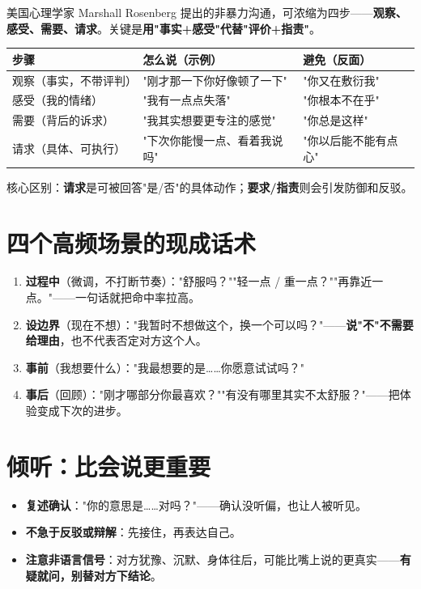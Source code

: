\documentclass[12pt,UTF8,openany]{ctexbook}
\begin{document}
美国心理学家 Marshall Rosenberg 提出的非暴力沟通，可浓缩为四步——\textbf{观察、感受、需要、请求}。关键是\textbf{用"事实+感受"代替"评价+指责"}。

\begin{tabularx}{\textwidth}{p{2.6cm}XX}
\toprule
步骤 & 怎么说（示例） & 避免（反面） \\
\midrule
观察（事实，不带评判） & "刚才那一下你好像顿了一下" & "你又在敷衍我" \\
感受（我的情绪） & "我有一点点失落" & "你根本不在乎" \\
需要（背后的诉求） & "我其实想要更专注的感觉" & "你总是这样" \\
请求（具体、可执行） & "下次你能慢一点、看着我说吗" & "你以后能不能有点心" \\
\bottomrule
\end{tabularx}

\vspace{0.5em}
\noindent 核心区别：\textbf{请求}是可被回答"是/否"的具体动作；\textbf{要求/指责}则会引发防御和反驳。

\section{四个高频场景的现成话术}

\begin{enumerate}[leftmargin=2em,itemsep=0.3em]
  \item \textbf{过程中}（微调，不打断节奏）："舒服吗？""轻一点 / 重一点？""再靠近一点。"——一句话就把命中率拉高。
  \item \textbf{设边界}（现在不想）："我暂时不想做这个，换一个可以吗？"——\textbf{说"不"不需要给理由}，也不代表否定对方这个人。
  \item \textbf{事前}（我想要什么）："我最想要的是……你愿意试试吗？"
  \item \textbf{事后}（回顾）："刚才哪部分你最喜欢？""有没有哪里其实不太舒服？"——把体验变成下次的进步。
\end{enumerate}

\section{倾听：比会说更重要}

\begin{itemize}[leftmargin=2em,itemsep=0.3em]
  \item \textbf{复述确认}："你的意思是……对吗？"——确认没听偏，也让人被听见。
  \item \textbf{不急于反驳或辩解}：先接住，再表达自己。
  \item \textbf{注意非语言信号}：对方犹豫、沉默、身体往后，可能比嘴上说的更真实——\textbf{有疑就问，别替对方下结论}。
\end{itemize}
\end{document}
